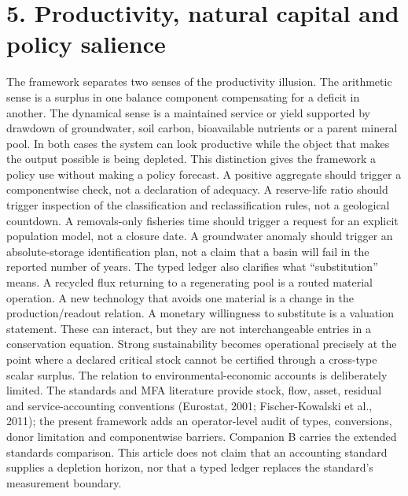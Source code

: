 \documentclass[11pt]{article}
\begin{document}
\section{5. Productivity, natural capital and policy salience}
The framework separates two senses of the productivity illusion. The arithmetic sense is a surplus in one balance component compensating for a deficit in another. The dynamical sense is a maintained service or yield supported by drawdown of groundwater, soil carbon, bioavailable nutrients or a parent mineral pool. In both cases the system can look productive while the object that makes the output possible is being depleted.
This distinction gives the framework a policy use without making a policy forecast. A positive aggregate should trigger a componentwise check, not a declaration of adequacy. A reserve-life ratio should trigger inspection of the classification and reclassification rules, not a geological countdown. A removals-only fisheries time should trigger a request for an explicit population model, not a closure date. A groundwater anomaly should trigger an absolute-storage identification plan, not a claim that a basin will fail in the reported number of years.
The typed ledger also clarifies what ``substitution'' means. A recycled flux returning to a regenerating pool is a routed material operation. A new technology that avoids one material is a change in the production/readout relation. A monetary willingness to substitute is a valuation statement. These can interact, but they are not interchangeable entries in a conservation equation. Strong sustainability becomes operational precisely at the point where a declared critical stock cannot be certified through a cross-type scalar surplus.
The relation to environmental-economic accounts is deliberately limited. The standards and MFA literature provide stock, flow, asset, residual and service-accounting conventions (Eurostat, 2001; Fischer-Kowalski et al., 2011); the present framework adds an operator-level audit of types, conversions, donor limitation and componentwise barriers. Companion B carries the extended standards comparison. This article does not claim that an accounting standard supplies a depletion horizon, nor that a typed ledger replaces the standard's measurement boundary.
\end{document}
